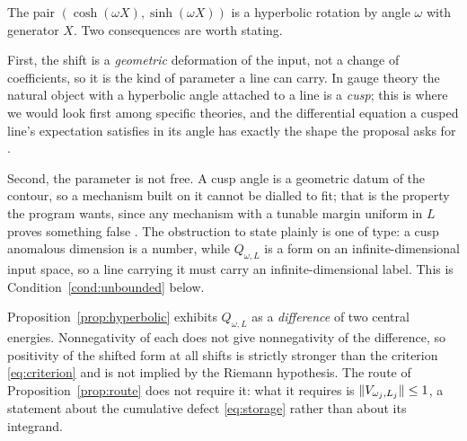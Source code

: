 \begin{remark}\label{rem:angle}
The pair $(\cosh(\omega X),\sinh(\omega X))$ is a hyperbolic rotation by angle
$\omega$ with generator $X$. Two consequences are worth stating.

First, the shift is a \emph{geometric} deformation of the input, not a change of
coefficients, so it is the kind of parameter a line can carry. In gauge theory
the natural object with a hyperbolic angle attached to a line is a \emph{cusp};
this is where we would look first among specific theories, and the differential
equation a cusped line's expectation satisfies in its angle has exactly the
shape the proposal asks for \cite{CHMS}.

Second, the parameter is not free. A cusp angle is a geometric datum of the
contour, so a mechanism built on it cannot be dialled to fit; that is the
property the program wants, since any mechanism with a tunable margin uniform in
$L$ proves something false \cite{Selection}. The obstruction to state plainly is
one of type: a cusp anomalous dimension is a number, while $Q_{\omega,L}$ is a
form on an infinite-dimensional input space, so a line carrying it must carry an
infinite-dimensional label. This is Condition~\ref{cond:unbounded} below.
\end{remark}

\begin{remark}
\label{rem:not-criterion}
Proposition~\ref{prop:hyperbolic} exhibits $Q_{\omega,L}$ as a \emph{difference}
of two central energies. Nonnegativity of each does not give nonnegativity of the
difference, so positivity of the shifted form at all shifts is strictly stronger
than the criterion \eqref{eq:criterion} and is not implied by the Riemann
hypothesis. The route of Proposition~\ref{prop:route} does not require it: what
it requires is $\lVert V_{\omega_j,L_j}\rVert\leq1$, a statement about the cumulative
defect \eqref{eq:storage} rather than about its integrand.
\end{remark}
